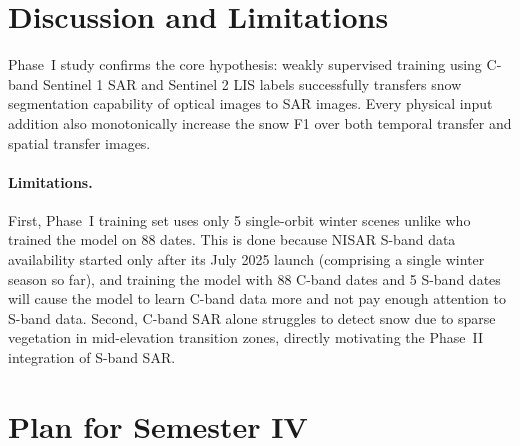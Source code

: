 \documentclass{article}
\newif\ifshowguide
\newcommand{\guide}[1]{%
  \ifshowguide
    \par\medskip\noindent
    \fcolorbox{blue!50}{blue!4}{%
      \begin{minipage}{\dimexpr\linewidth-2\fboxsep-2\fboxrule\relax}
        \small\color{blue!55!black}\textbf{Guidance.} #1
      \end{minipage}}%
    \par\medskip
  \fi}
\begin{document}

\section{Discussion and Limitations}
\label{sec:discussion}

\guide{About half a page. What do the Phase~I results tell you about the
original plan? Has the problem or approach changed since the start of the
semester, and why? State the limitations of the current work (data, method,
evaluation) honestly.}

Phase~I study confirms the core hypothesis: weakly supervised training using C-band Sentinel 1 SAR and Sentinel 2 LIS labels successfully transfers snow segmentation capability of optical images to SAR images. Every physical input addition also monotonically increase the snow F1 over both temporal transfer and spatial transfer images.

\paragraph{Limitations.}
First, Phase~I training set uses only 5 single-orbit winter scenes unlike \citet{briand2026weakly} who trained the model on 88 dates. This is done because NISAR S-band data availability started only after its July 2025 launch (comprising a single winter season so far), and training the model with 88 C-band dates and 5 S-band dates will cause the model to learn C-band data more and not pay enough attention to S-band data. Second, C-band SAR alone struggles to detect snow due to sparse vegetation in mid-elevation transition zones, directly motivating the Phase~II integration of S-band SAR.

\section{Plan for Semester IV}
\label{sec:plan}
\end{document}
